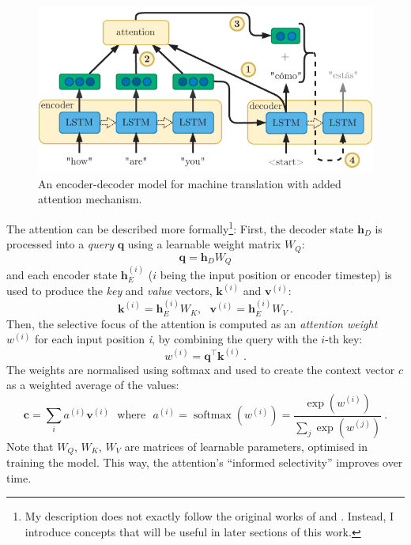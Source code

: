 \documentclass[bsc,frontabs,singlespacing,parskip,deptreport]{infthesis}
\DeclareMathOperator{\softmax}{softmax}
\begin{document}
{{    \begin{figure}[h!t]
      \centering
      \includegraphics[width=11.5cm]{graphics/encoder-decoder-att}
      \cprotect\caption{An encoder-decoder model for machine translation with added attention mechanism.}
      \label{fig:encoder-decoder-att}
    \end{figure}
    
    The attention can be described more formally\footnote{My description does not exactly follow the original works of \citet{Bahdanau_2014} and \citet{Luong_2015}. Instead, I introduce concepts that will be useful in later sections of this work.}: First, the decoder state $\bm{h}_D$ is processed into a \textit{query} $\bm{q}$ using a learnable weight matrix $W_Q$:
    \begin{equation}
    \bm{q}=\bm{h}_DW_Q
    \end{equation}
    and each encoder state $\bm{h}_E^{(i)}$ ($i$ being the input position or encoder timestep) is used to produce the \textit{key} and \textit{value} vectors, $\bm{k}^{(i)}$ and $\bm{v}^{(i)}$:
    \begin{equation}
    \bm{k}^{(i)} = \bm{h}_E^{(i)}W_K,\ \ \ \bm{v}^{(i)} = \bm{h}_E^{(i)}W_V\ .
    \end{equation}
    Then, the selective focus of the attention is computed as an \textit{attention weight} $w^{(i)}$ for each input position \textit{i}, by combining the query with the $i$-th key:
    \begin{equation}
    w^{(i)}=\bm{q}^\top\bm{k}^{(i)}\ .
    \end{equation}
    The weights are normalised using softmax and used to create the context vector $c$ as a weighted average of the values:
    \begin{equation}
    \bm{c}=\sum_{i}a^{(i)}\bm{v}^{(i)}\ \ \ \textrm{where}\ \ \ a^{(i)}=\softmax(w^{(i)})=\frac{\exp{(w^{(i)})}}{\sum_{j}\exp{(w^{(j)})}}\ .
    \end{equation}
    Note that $W_Q$, $W_K$, $W_V$ are matrices of learnable parameters, optimised in training the model. This way, the attention's ``informed selectivity'' improves over time.
    
}}
\end{document}
